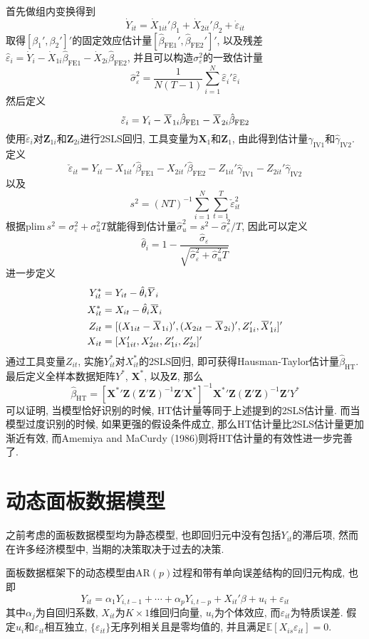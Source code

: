 \documentclass[cn, 12pt, math=mtpro2, bibstyle=apa, blue, twocol]{elegantbook}
\newcommand{\E}{\mathbb{E}}
\newcommand{\X}{\mathbold{X}}
\newcommand{\Z}{\mathbold{Z}}
\newcommand{\hb}{\hat{\beta}}
\newcommand{\overbar}[1]{\mkern 1.5mu\overline{\mkern-1.5mu#1\mkern-1.5mu}\mkern 1.5mu}
\begin{document}
首先做组内变换得到
$$\dot{Y}_{it}=\dot{X}_{1it}'\beta_1+\dot{X}_{2it}'\beta_2+\dot{\varepsilon}_{it}$$
取得$[\beta_1',\beta_2']'$的固定效应估计量$[\hb_{\text{FE1}}',\hb_{\text{FE2}}']'$, 以及残差$\hat{\varepsilon}_{i}=\dot{Y}_{i}-\dot{X}_{1i}\hb_{\text{FE1}}-\dot{X}_{2i}\hb_\text{FE2}$, 并且可以构造$\sigma_\varepsilon^2$的一致估计量
$$\hat{\sigma}_\varepsilon^2=\frac{1}{N(T-1)}\sum_{i=1}^{N}\hat{\varepsilon}_i'\hat{\varepsilon}_i$$
然后定义
$$\tilde{\varepsilon}_i=Y_i-\overbar{X}_{1i}\hb_\text{FE1}-\overbar{X}_{2i}\hb_\text{FE2}$$
使用$\tilde{\varepsilon}_i$对$\Z_{1i}$和$\Z_{2i}$进行2SLS回归, 工具变量为$\X_1$和$\Z_1$, 由此得到估计量$\hat{\gamma}_{\text{IV1}}$和$\hat{\gamma}_\text{IV2}$. 定义
$$\check{\varepsilon}_{it}=Y_{it}-X_{1it}'\hb_{\text{FE1}}-X_{2it}'\hb_\text{FE2}-Z_{1it}'\hat{\gamma}_{\text{IV1}}-Z_{2it}'\hat{\gamma}_{\text{IV2}}$$
以及
$$s^2=(NT)^{-1}\sum_{i=1}^{N}\sum_{t=1}^{T}\check{\varepsilon}_{it}^2$$
根据$\text{plim}\,s^2=\sigma_\varepsilon^2+\sigma_u^2T$就能得到估计量$\hat{\sigma}_u^2=s^2-\hat{\sigma}_\varepsilon^2/T$, 因此可以定义
$$\hat{\theta}_i=1-\frac{\hat{\sigma}_\varepsilon}{\sqrt{\hat{\sigma}_\varepsilon^2+\hat{\sigma}_u^2T}}$$
进一步定义
\begin{align*}
Y_{it}^\ast&=Y_{it}-\hat{\theta}_i\overbar{Y}_i \\
X_{it}^\ast&=X_{it}-\hat{\theta}_i\overbar{X}_i \\
Z_{it}&=[(X_{1it}-\overbar{X}_{1i})',(X_{2it}-\overbar{X}_{2i})',Z_{1i}',\overbar{X}_{1i}']' \\
X_{it}&=[X_{1it}',X_{2it}',Z_{1i}',Z_{2i}']'
\end{align*}
通过工具变量$Z_{it}$, 实施$Y_{it}^\ast$对$X_{it}^\ast$的2SLS回归, 即可获得Hausman-Taylor估计量$\hb_{\text{HT}}$. 最后定义全样本数据矩阵$Y^\ast$, $\X^\ast$, 以及$\Z$, 那么
$$\hb_{\text{HT}}=[\X^\ast{'}\Z(\Z'\Z)^{-1}\Z{'}\X^\ast]^{-1}\X^\ast{'}\Z(\Z'\Z)^{-1}\Z{'}Y^\ast$$
可以证明, 当模型恰好识别的时候, HT估计量等同于上述提到的2SLS估计量. 而当模型过度识别的时候, 如果更强的假设条件成立, 那么HT估计量比2SLS估计量更加渐近有效, 而Amemiya and MaCurdy (1986)则将HT估计量的有效性进一步完善了.
\section{动态面板数据模型}
之前考虑的面板数据模型均为静态模型, 也即回归元中没有包括$Y_{it}$的滞后项, 然而在许多经济模型中, 当期的决策取决于过去的决策.

面板数据框架下的动态模型由$\text{AR}(p)$过程和带有单向误差结构的回归元构成, 也即
\begin{equation}\label{eq8.44}
  Y_{it}=\alpha_1Y_{i,t-1}+\cdots+\alpha_pY_{i,t-p}+X_{it}'\beta+u_i+\varepsilon_{it}
\end{equation}
其中$\alpha_j$为自回归系数, $X_{it}$为$K\times1$维回归向量, $u_i$为个体效应, 而$\varepsilon_{it}$为特质误差. 假定$u_i$和$\varepsilon_{it}$相互独立, $\{\varepsilon_{it}\}$无序列相关且是零均值的, 并且满足$\E[X_{is}\varepsilon_{it}]=0$.
\end{document}
